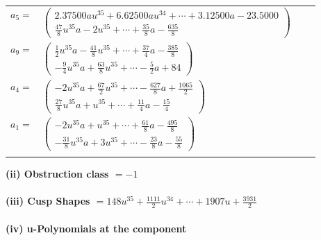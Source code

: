 \documentclass[1p]{elsarticle_modified}
\theoremstyle{definition}
\begin{document}
\begin{tabular}{m{7pt} m{180pt} m{7pt} m{180pt} }
\flushright $a_{5}=$&$\begin{pmatrix}2.37500 a u^{35}+6.62500 a u^{34}+\cdots+3.12500 a-23.5000\\\frac{47}{8} u^{35} a-2 u^{35}+\cdots+\frac{35}{8} a-\frac{635}{8}\end{pmatrix}$ \\
\flushright $a_{9}=$&$\begin{pmatrix}\frac{1}{2} u^{35} a-\frac{41}{8} u^{35}+\cdots+\frac{37}{4} a-\frac{385}{8}\\-\frac{9}{4} u^{35} a+\frac{63}{8} u^{35}+\cdots-\frac{5}{2} a+84\end{pmatrix}$ \\
\flushright $a_{4}=$&$\begin{pmatrix}-2 u^{35} a+\frac{67}{2} u^{35}+\cdots-\frac{627}{8} a+\frac{1065}{2}\\\frac{27}{8} u^{35} a+u^{35}+\cdots+\frac{11}{4} a-\frac{15}{4}\end{pmatrix}$ \\
\flushright $a_{1}=$&$\begin{pmatrix}-2 u^{35} a+u^{35}+\cdots+\frac{61}{8} a-\frac{495}{8}\\-\frac{31}{8} u^{35} a+3 u^{35}+\cdots-\frac{23}{8} a-\frac{55}{8}\end{pmatrix}$\\&\end{tabular}
\flushleft \textbf{(ii) Obstruction class $= -1$}\\~\\
\flushleft \textbf{(iii) Cusp Shapes $= 148 u^{35}+\frac{1111}{2} u^{34}+\cdots+1907 u+\frac{3931}{2}$}\\~\\
\newpage\renewcommand{\arraystretch}{1}
\flushleft \textbf{(iv) u-Polynomials at the component}\newline \\
\end{document}
